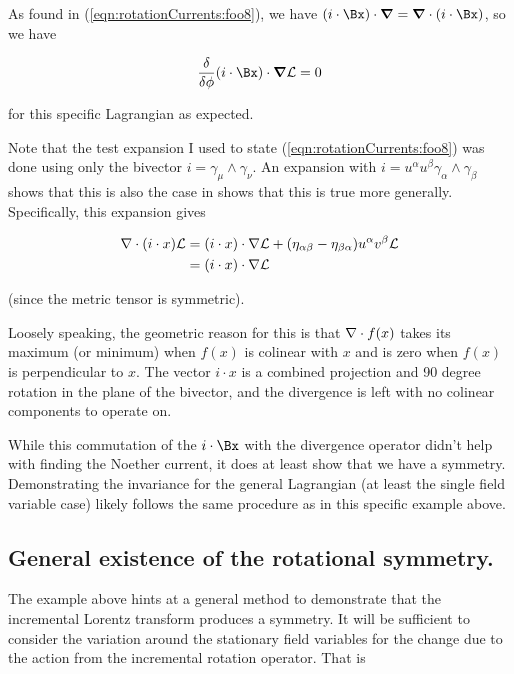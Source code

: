 As found in (\ref{eqn:rotationCurrents:foo8}), we have $(i \cdot \Bx) \cdot \spacegrad = \spacegrad \cdot (i \cdot \Bx)$, so we have

\begin{align}\label{eqn:rotationCurrents:foo15}
\frac{\delta }{\delta \phi} (i \cdot \Bx) \cdot \spacegrad \LL = 0
\end{align}

for this specific Lagrangian as expected.

Note that the test expansion I used to state (\ref{eqn:rotationCurrents:foo8}) was done using only the bivector $i = \gamma_\mu \wedge \gamma_\nu$.  An expansion with $i = u^\alpha u^\beta \gamma_\alpha \wedge \gamma_\beta$ shows that this is also the case in shows that this is true more generally.  Specifically, this expansion gives

\begin{align*}
\nabla \cdot (i \cdot x) \mathcal{L} 
&= (i \cdot x) \cdot \nabla \mathcal{L} + (\eta_{\alpha\beta} - \eta_{\beta\alpha}) u^\alpha v^\beta \mathcal{L} \\
&= (i \cdot x) \cdot \nabla \mathcal{L} 
\end{align*}

(since the metric tensor is symmetric).

Loosely speaking, the geometric reason for this is that $\nabla \cdot f(x)$ takes its maximum (or minimum) when $f(x)$ is colinear with $x$ and is zero when $f(x)$ is perpendicular to $x$.  The vector $i \cdot x$ is a combined projection and 90 degree rotation in the plane of the bivector, and the divergence is left with no colinear components to operate on.

While this commutation of the $i \cdot \Bx$ with the divergence operator didn't help with finding the Noether current, it does at least show that we have a symmetry.  Demonstrating the invariance for the general Lagrangian (at least the single field variable case) likely follows the same procedure as in this specific example above.

\subsection{General existence of the rotational symmetry.}

The example above hints at a general method to demonstrate that the incremental Lorentz transform produces a symmetry.  It will be sufficient to consider the variation around the stationary field variables for the change due to the action from the incremental rotation operator.  That is

